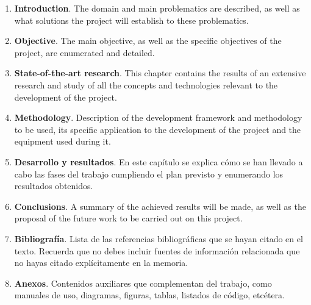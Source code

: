 \begin{enumerate}

\item \textbf{Introduction}. The domain and main problematics are described, as well as what solutions the project will establish to these problematics.

\item \textbf{Objective}. The main objective, as well as the specific objectives of the project, are enumerated and detailed.

\item \textbf{State-of-the-art research}. This chapter contains the results of an extensive research and study of all the concepts and technologies relevant to the development of the project.

\item \textbf{Methodology}. Description of the development framework and methodology to be used, its specific application to the development of the project and the equipment used during it.

\item \textbf{Desarrollo y resultados}. En este capítulo se explica cómo se han llevado a cabo las fases del trabajo cumpliendo el plan previsto y enumerando los resultados obtenidos.

\item \textbf{Conclusions}. A summary of the achieved results will be made, as well as the proposal of the future work to be carried out on this project.

\item \textbf{Bibliografía}. Lista de las referencias bibliográficas que se hayan citado en el texto. Recuerda que no debes incluir fuentes de información relacionada que no hayas citado explícitamente en la memoria.

\item \textbf{Anexos}. Contenidos auxiliares que complementan del trabajo, como manuales de uso, diagramas, figuras, tablas, listados de código, etcétera.
\end{enumerate}









